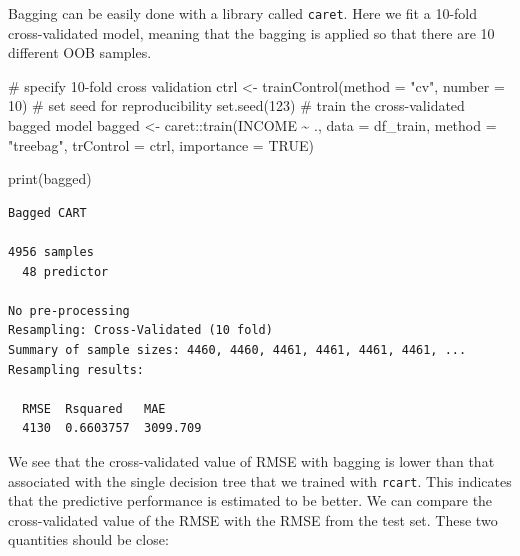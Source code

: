 \documentclass[
  letterpaper,
  DIV=11,
  numbers=noendperiod]{scrreprt}
\newenvironment{Shaded}{\begin{snugshade}}{\end{snugshade}}
\newcommand{\AttributeTok}[1]{\textcolor[rgb]{0.40,0.45,0.13}{#1}}
\newcommand{\CommentTok}[1]{\textcolor[rgb]{0.37,0.37,0.37}{#1}}
\newcommand{\ConstantTok}[1]{\textcolor[rgb]{0.56,0.35,0.01}{#1}}
\newcommand{\DecValTok}[1]{\textcolor[rgb]{0.68,0.00,0.00}{#1}}
\newcommand{\FunctionTok}[1]{\textcolor[rgb]{0.28,0.35,0.67}{#1}}
\newcommand{\NormalTok}[1]{\textcolor[rgb]{0.00,0.23,0.31}{#1}}
\newcommand{\OtherTok}[1]{\textcolor[rgb]{0.00,0.23,0.31}{#1}}
\newcommand{\SpecialCharTok}[1]{\textcolor[rgb]{0.37,0.37,0.37}{#1}}
\newcommand{\StringTok}[1]{\textcolor[rgb]{0.13,0.47,0.30}{#1}}
\begin{document}
Bagging can be easily done with a library called \texttt{caret}. Here we
fit a 10-fold cross-validated model, meaning that the bagging is applied
so that there are 10 different OOB samples.

\begin{Shaded}
\begin{Highlighting}[]
\CommentTok{\# specify 10{-}fold cross validation}
\NormalTok{ctrl }\OtherTok{\textless{}{-}} \FunctionTok{trainControl}\NormalTok{(}\AttributeTok{method =} \StringTok{"cv"}\NormalTok{,  }\AttributeTok{number =} \DecValTok{10}\NormalTok{) }
\CommentTok{\# set seed for reproducibility}
\FunctionTok{set.seed}\NormalTok{(}\DecValTok{123}\NormalTok{)}
\CommentTok{\# train the cross{-}validated bagged model}
\NormalTok{bagged }\OtherTok{\textless{}{-}}\NormalTok{ caret}\SpecialCharTok{::}\FunctionTok{train}\NormalTok{(INCOME }\SpecialCharTok{\textasciitilde{}}\NormalTok{ ., }\AttributeTok{data =}\NormalTok{ df\_train, }\AttributeTok{method =} \StringTok{"treebag"}\NormalTok{, }\AttributeTok{trControl =}\NormalTok{ ctrl, }\AttributeTok{importance =} \ConstantTok{TRUE}\NormalTok{)}

\FunctionTok{print}\NormalTok{(bagged)}
\end{Highlighting}
\end{Shaded}

\begin{verbatim}
Bagged CART 

4956 samples
  48 predictor

No pre-processing
Resampling: Cross-Validated (10 fold) 
Summary of sample sizes: 4460, 4460, 4461, 4461, 4461, 4461, ... 
Resampling results:

  RMSE  Rsquared   MAE     
  4130  0.6603757  3099.709
\end{verbatim}

We see that the cross-validated value of RMSE with bagging is lower than
that associated with the single decision tree that we trained with
\texttt{rcart}. This indicates that the predictive performance is
estimated to be better. We can compare the cross-validated value of the
RMSE with the RMSE from the test set. These two quantities should be
close:

\begin{Shaded}
\end{Shaded}
\end{document}
